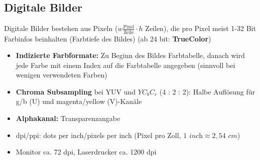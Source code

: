 \documentclass[12pt,landscape]{article}
\begin{document}
\begin{multicols}{3}
\begin{itemize}
\end{itemize}
\subsection{Digitale Bilder}
Digitale Bilder bestehen aus Pixeln ($w \frac{\text{Pixel}}{\text{Zeile}} \cdot h \text{ Zeilen}$), die pro Pixel meist 1-32 Bit Farbinfos beinhalten (Farbtiefe des Bildes) (ab 24 bit: \textbf{TrueColor})
\begin{itemize}
\item \textbf{Indizierte Farbformate:} Zu Beginn des Bildes Farbtabelle, danach wird jede Farbe mit einem Index auf die Farbtabelle angegeben (sinnvoll bei wenigen verwendeten Farben)
\item \textbf{Chroma Subsampling} bei YUV und $YC_bC_r$ (4 : 2 : 2): Halbe Auflösung für g/b (U) und magenta/yellow (V)-Kanäle
\item \textbf{Alphakanal:} Transparenzangabe
\item dpi/ppi: dots per inch/pixels per inch (Pixel pro Zoll, $1 \textit{ inch} \approx 2,54\textit{ cm}$)
\item Monitor ca. 72 dpi, Laserdrucker ca. 1200 dpi
\end{itemize}

\end{multicols}
\end{document}

